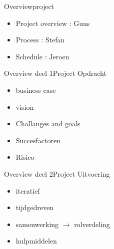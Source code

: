 \begin{frame}{Overview}{project}
    \begin{itemize}
	\item Project overview : Guus
	\item Process : Stefan
	\item Schedule : Jeroen
    \end{itemize}
\end{frame}

\begin{frame}{Overview deel 1}{Project Opdracht}

    \begin{itemize}
        \item business case
        \item vision
        \item Challanges and goals
        \item Succesfactoren
        \item Risico
    \end{itemize}


\end{frame}

\begin{frame}{Overview deel 2}{Project Uitvoering}

    \begin{itemize}
        \item iteratief
        \item tijdgedreven
        \item samenwerking $\rightarrow$ rolverdeling
        \item hulpmiddelen
    \end{itemize}

\end{frame}

